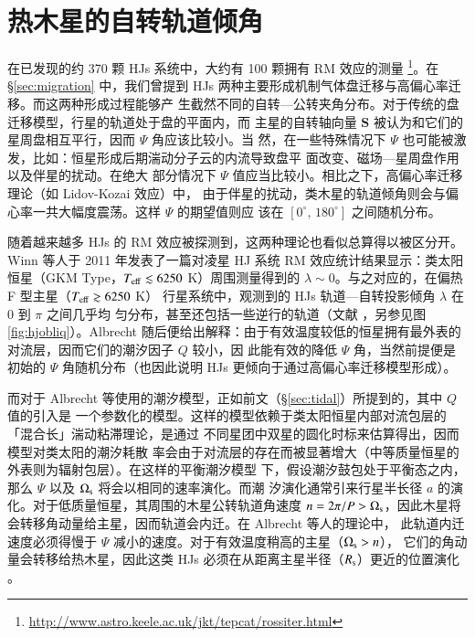 \section{热木星的自转轨道倾角}   

在已发现的约 370 颗 HJs 系统中，大约有 100 颗拥有 RM 效应的测量
\footnote{\url{http://www.astro.keele.ac.uk/jkt/tepcat/rossiter.html}}。在 \S \ref{sec:migration} 
中，我们曾提到 HJs 两种主要形成机制气体盘迁移与高偏心率迁移。而这两种形成过程能够产
生截然不同的自转---公转夹角分布。对于传统的盘迁移模型，行星的轨道处于盘的平面内，而
主星的自转轴向量 $\bm{S} $ 被认为和它们的星周盘相互平行，因而 $\Psi$ 角应该比较小。当
然，在一些特殊情况下 $\Psi$ 也可能被激发，比如：恒星形成后期湍动分子云的内流导致盘平
面改变\cite{Bate2010}、磁场---星周盘作用\cite{Lai2011}以及伴星的扰动\cite{Lai2014}。在绝大
部分情况下 $\Psi$ 值应当比较小。相比之下，高偏心率迁移理论（如 Lidov-Kozai 效应）中，
由于伴星的扰动，类木星的轨道倾角则会与偏心率一共大幅度震荡。这样 $\Psi$ 的期望值则应
该在 $[0^\circ,\,180^\circ]$ 之间随机分布。

随着越来越多 HJs 的 RM 效应被探测到，这两种理论也看似总算得以被区分开。Winn 等人于 2011 
年发表了一篇对凌星 HJ 系统 RM 效应统计结果显示：类太阳恒星（GKM Type，$T_\mathrm{eff} \lesssim 
6250 $ K）周围测量得到的 $\lambda \sim 0$。与之对应的，在偏热 F 型主星（$T_\mathrm{eff} \gtrsim 
6250 $ K） 行星系统中，观测到的 HJs 轨道---自转投影倾角 $\lambda$ 在 0 到 $\pi$ 之间几乎均
匀分布，甚至还包括一些逆行的轨道（文献 ，另参见图 \ref{fig:hjobliq}）。Albrecht 
随后便给出解释：由于有效温度较低的恒星拥有最外表的对流层，因而它们的潮汐因子 $Q$ 较小，因
此能有效的降低 $\Psi$ 角\cite{Albrecht2012}，当然前提便是初始的 $\Psi$ 角随机分布（也因此说明
HJs 更倾向于通过高偏心率迁移模型形成）。

而对于 Albrecht 等使用的潮汐模型，正如前文（\S \ref{sec:tidal}）所提到的，其中 $Q$ 值的引入是
一个参数化的模型。这样的模型依赖于类太阳恒星内部对流包层的「混合长」湍动粘滞理论，是通过
不同星团中双星的圆化时标来估算得出\cite{Zahn1977,Mathieu1994}，因而模型对类太阳的潮汐耗散
率会由于对流层的存在而被显著增大（中等质量恒星的外表则为辐射包层）。在这样的平衡潮汐模型
下，假设潮汐鼓包处于平衡态之内，那么 $\Psi$ 以及 $\Omega_\mathrm{s}$ 将会以相同的速率演化。而潮
汐演化通常引来行星半长径 $a$ 的演化。对于低质量恒星，其周围的木星公转轨道角速度 $n=2\pi/P 
> \Omega_\mathrm{s}$，因此木星将会转移角动量给主星，因而轨道会内迁。在 Albrecht 等人的理论中，
此轨道内迁速度必须得慢于 $\Psi$ 减小的速度。对于有效温度稍高的主星（$\Omega_\mathrm{s} > n$），
它们的角动量会转移给热木星，因此这类 HJs 必须在从距离主星半径（$R_\mathrm{s}$）更近的位置演化
\cite{Rogers2013}。

